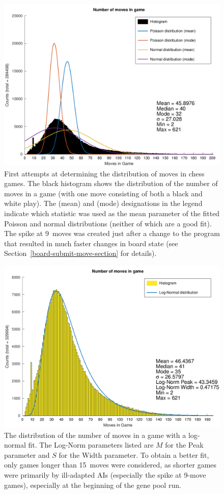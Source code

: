 \documentclass[letterpaper]{article}
\renewcommand\_{\textunderscore\allowbreak}
\begin{document}
\begin{figure}[tbh]
	\centering
	\includegraphics[width=\textwidth]{game_length_distribution.png}
	\caption{First attempts at determining the distribution of moves in chess games. The black histogram shows the distribution of the number of moves in a game (with one move consisting of both a black and white play). The (mean) and (mode) designations in the legend indicate which statistic was used as the mean parameter of the fitted Poisson and normal distributions (neither of which are a good fit). The spike at 9~moves was created just after a change to the program that resulted in much faster changes in board state (see Section~\ref{board-submit-move-section} for details).}
	\label{game-length-plot}
\end{figure}

\begin{figure}[tbh]
	\centering
	\includegraphics[width=\textwidth]{game_length_log_norm_distribution.png}
	\caption{The distribution of the number of moves in a game with a log-normal fit. The Log-Norm parameters listed are \(M\) for the Peak parameter and \(S\) for the Width parameter. To obtain a better fit, only games longer than 15~moves were considered, as shorter games were primarily by ill-adapted AIs (especially the spike at 9-move games), especially at the beginning of the gene pool run.}
	\label{log-norm-plot}
\end{figure}
\end{document}
